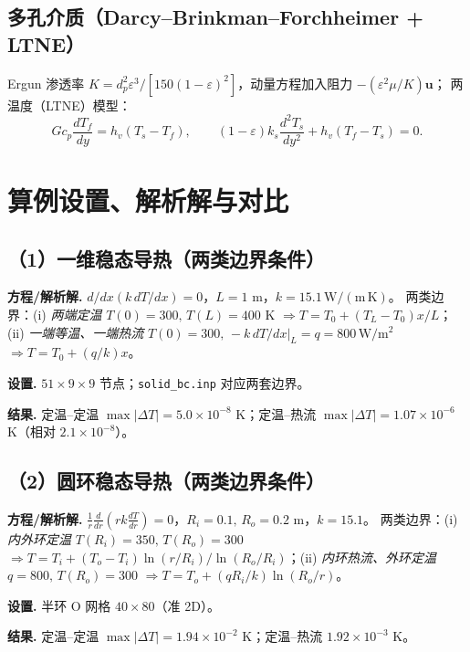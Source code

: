 \documentclass[11pt]{ctexart}
\begin{document}
\subsection{多孔介质（Darcy--Brinkman--Forchheimer + LTNE）}
Ergun 渗透率 $K=d_p^2\varepsilon^3/[150(1-\varepsilon)^2]$，动量方程加入阻力 $-(\varepsilon^2\mu/K)\bm{u}$；
两温度（LTNE）模型：
\begin{equation}
G c_p \frac{d T_f}{dy}=h_v(T_s-T_f),\qquad (1-\varepsilon)k_s\frac{d^2T_s}{dy^2}+h_v(T_f-T_s)=0 .
\end{equation}

\section{算例设置、解析解与对比}

\subsection{（1）一维稳态导热（两类边界条件）}
\textbf{方程/解析解.} $d/dx(k\,dT/dx)=0$，$L=1$ m，$k=15.1\,\mathrm{W/(m\,K)}$。
两类边界：(i) \emph{两端定温} $T(0)=300,\,T(L)=400$ K $\Rightarrow T=T_0+(T_L-T_0)x/L$；(ii) \emph{一端等温、一端热流} $T(0)=300,\,-k\,dT/dx|_L=q=800\,\mathrm{W/m^2}$ $\Rightarrow T=T_0+(q/k)x$。\par
\textbf{设置.} $51\times9\times9$ 节点；\texttt{solid\_bc.inp} 对应两套边界。\par
\textbf{结果.} 定温–定温 $\max|\Delta T|=5.0\times10^{-8}$ K；定温–热流 $\max|\Delta T|=1.07\times10^{-6}$ K（相对 $2.1\times10^{-8}$）。

\subsection{（2）圆环稳态导热（两类边界条件）}
\textbf{方程/解析解.} $\frac{1}{r}\frac{d}{dr}(r k\frac{dT}{dr})=0$，$R_i=0.1,\,R_o=0.2$ m，$k=15.1$。
两类边界：(i) \emph{内外环定温} $T(R_i)=350,\,T(R_o)=300$ $\Rightarrow T=T_i+(T_o-T_i)\ln(r/R_i)/\ln(R_o/R_i)$；(ii) \emph{内环热流、外环定温} $q=800,\,T(R_o)=300$ $\Rightarrow T=T_o+(q R_i/k)\ln(R_o/r)$。\par
\textbf{设置.} 半环 O 网格 $40\times80$（准 2D）。\par
\textbf{结果.} 定温–定温 $\max|\Delta T|=1.94\times10^{-2}$ K；定温–热流 $1.92\times10^{-3}$ K。
\end{document}
